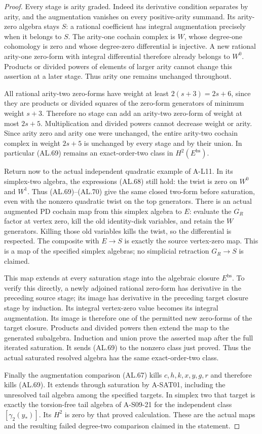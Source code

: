\begin{proof}
Every stage is arity graded.  Indeed its derivative
condition separates by arity, and the augmentation
vanishes on every positive-arity summand.
Its arity-zero algebra stays $S$: a rational
coefficient has integral augmentation precisely
when it belongs to $S$.
The arity-one cochain complex is $W$, whose
degree-one cohomology is zero and whose degree-zero
differential is injective.  A new rational arity-one
zero-form with integral differential therefore
already belongs to $W^0$.  Products or divided
powers of elements of larger arity cannot change
this assertion at a later stage.
Thus arity one remains unchanged throughout.

All rational arity-two zero-forms have weight at
least $2(s+3)=2s+6$, since they are products or
divided squares of the zero-form generators of
minimum weight $s+3$.
Therefore no stage can add an arity-two zero-form
of weight at most $2s+5$.
Multiplication and divided powers cannot decrease
weight or arity.  Since arity zero and arity one
were unchanged, the entire arity-two cochain
complex in weight $2s+5$ is unchanged by every
stage and by their union.
In particular (AL.69) remains an exact-order-two
class in $H^2(E^{\mathrm{bs}})$.

Return now to the actual independent quadratic
example of A-L11.  In its simplex-two algebra,
the expressions (AL.68) still hold: the twist is
zero on $W^0$ and $W^1$.
Thus (AL.69)--(AL.70) give the same closed
two-form before saturation, even with the nonzero
quadratic twist on the top generators.
There is an actual augmented PD cochain map
from this simplex algebra to $E$: evaluate the
$G_R$ factor at vertex zero, kill the old
identity-disk variables, and retain the $W$
generators.  Killing those old variables kills
the twist, so the differential is respected.
The composite with $E\to S$ is exactly the
source vertex-zero map.  This is a map of the
specified simplex algebras; no simplicial
retraction $G_R\to S$ is claimed.

This map extends at every saturation stage into
the algebraic closure $E^{\mathrm{bs}}$.
To verify this directly, a newly adjoined rational
zero-form has derivative in the preceding source
stage; its image has derivative in the preceding
target closure stage by induction.  Its integral
vertex-zero value becomes its integral augmentation.
Its image is therefore one of the permitted new
zero-forms of the target closure.  Products and
divided powers then extend the map to the generated
subalgebra.  Induction and union prove the asserted
map after the full iterated saturation.
It sends (AL.69) to the nonzero class just proved.
Thus the actual saturated resolved algebra has
the same exact-order-two class.

Finally the augmentation comparison (AL.67) kills
$c,h,k,x,y,g,r$ and therefore kills (AL.69).
It extends through saturation by A-SAT01, including
the unresolved tail algebra among the specified
targets.  In simplex two that target is exactly
the torsion-free tail algebra of A-S09-21 for
the independent class $[\gamma_2(y_*)]$.
Its $H^2$ is zero by that proved calculation.
These are the actual maps and the resulting
failed degree-two comparison claimed in the
statement.
\end{proof}

